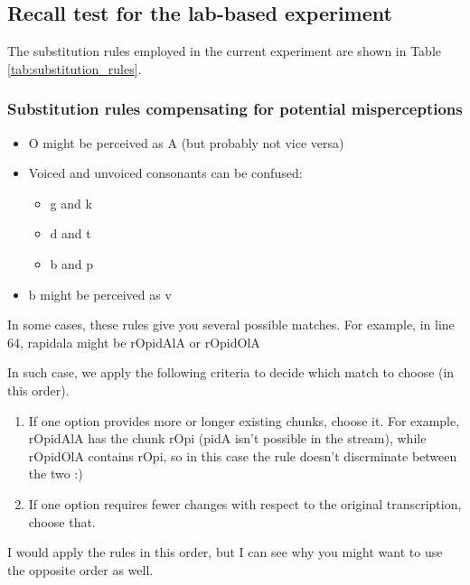 \documentclass[]{article}
\providecommand{\tightlist}{%
  \setlength{\itemsep}{0pt}\setlength{\parskip}{0pt}}
\begin{document}
\subsection{Recall test for the lab-based
experiment}\label{recall-test-for-the-lab-based-experiment}

The substitution rules employed in the current experiment are shown in
Table \ref{tab:substitution_rules}.

\subsubsection{Substitution rules compensating for potential
misperceptions}\label{substitution-rules-compensating-for-potential-misperceptions}

\begin{itemize}
\tightlist
\item
  O might be perceived as A (but probably not vice versa)
\item
  Voiced and unvoiced consonants can be confused:

  \begin{itemize}
  \tightlist
  \item
    g and k
  \item
    d and t
  \item
    b and p
  \end{itemize}
\item
  b might be perceived as v
\end{itemize}

In some cases, these rules give you several possible matches. For
example, in line 64, rapidala might be rOpidAlA or rOpidOlA

In such case, we apply the following criteria to decide which match to
choose (in this order).

\begin{enumerate}
\def\labelenumi{\arabic{enumi}.}
\item
  If one option provides more or longer existing chunks, choose it. For
  example, rOpidAlA has the chunk rOpi (pidA isn't possible in the
  stream), while rOpidOlA contains rOpi, so in this case the rule
  doesn't discrminate between the two :)
\item
  If one option requires fewer changes with respect to the original
  transcription, choose that.
\end{enumerate}

I would apply the rules in this order, but I can see why you might want
to use the opposite order as well.
\end{document}
